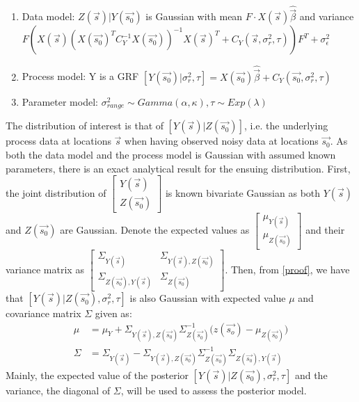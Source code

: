 \begin{enumerate}
\item Data model: $Z(\vec{s})|Y(\vec{s_0})$ is Gaussian with mean $F \cdot X(\vec{s})\hat{\vec{\beta}}$ and variance $F(X(\vec{s})(X(\vec{s_0})^{T}C_Y^{-1}X(\vec{s_0}))^{-1}X(\vec{s})^T + C_Y(\vec{s}, \sigma_{r}^2, \tau))F^T + \sigma_{\epsilon}^2$ 
\item Process model: Y is a GRF $[Y(\vec{s_0}) | \sigma_{r}^2, \tau]  = X(\vec{s_0})\hat{\vec{\beta}} + C_Y(\vec{s_0}, \sigma_{r}^2, \tau)$
\item Parameter model: $\sigma_{range}^2 \sim Gamma(\alpha, \kappa), \tau \sim Exp(\lambda)$ 
\end{enumerate}

The distribution of interest is that of $[Y(\vec{s}) | Z(\vec{s_0})]$, i.e. the underlying process data at locations $\vec{s}$ when having observed noisy data at locations $\vec{s_0}$. As both the data model and the process model is Gaussian with assumed known parameters, there is an exact analytical result for the ensuing distribution. First, the joint distribution of $\begin{bmatrix} Y(\vec{s}) \\ Z(\vec{s_0}) \end{bmatrix}$ is known bivariate Gaussian as both $ Y(\vec{s})$ and $Z(\vec{s_0})$ are Gaussian. Denote the expected values as $\begin{bmatrix} \mu_{Y(\vec{s})} \\ \mu_{Z(\vec{s_0})} \end{bmatrix}$ and their variance matrix as $\begin{bmatrix} \Sigma_{Y(\vec{s})} & \Sigma_{Y(\vec{s}), Z(\vec{s_0})} \\ \Sigma_{Z(\vec{s_0}), Y(\vec{s})} & \Sigma_{Z(\vec{s_0})} \end{bmatrix}$. Then, from \ref{proof}, we have that $[Y(\vec{s}) | Z(\vec{s_0}), \sigma_r^2, \tau]$ is also Gaussian with expected value $\mu$ and covariance matrix $\Sigma$ given as:
\begin{align*}
\mu &= \mu_Y + \Sigma_{Y(\vec{s}), Z(\vec{s_0})} \Sigma_{Z(\vec{s_0})}^{-1}\big(z(\vec{s_o}) - \mu_{Z(\vec{s_0})} \big)\\
\Sigma &= \Sigma_{Y(\vec{s})} - \Sigma_{Y(\vec{s}), Z(\vec{s_0})} \Sigma_{Z(\vec{s_0})}^{-1}\Sigma_{Z(\vec{s_0}), Y(\vec{s})}
\end{align*}
Mainly, the expected value of the posterior $[Y(\vec{s}) | Z(\vec{s_0}),\sigma_r^2, \tau]$ and the variance, the diagonal of $\Sigma$, will be used to assess the posterior model. \\
